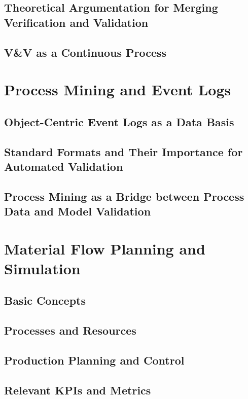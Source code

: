 \subsection{Theoretical Argumentation for Merging Verification and Validation}

\subsection{V\&V as a Continuous Process}

\section{Process Mining and Event Logs}
\subsection{Object-Centric Event Logs as a Data Basis}

\subsection{Standard Formats and Their Importance for Automated Validation}

\subsection{Process Mining as a Bridge between Process Data and Model Validation}

\section{Material Flow Planning and Simulation}
\subsection{Basic Concepts}

\subsection{Processes and Resources}

\subsection{Production Planning and Control}

\subsection{Relevant KPIs and Metrics}
